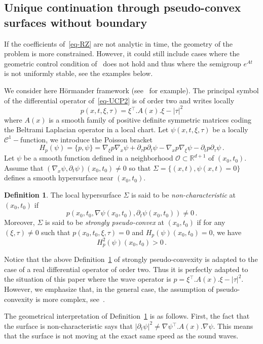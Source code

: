 \documentclass[11pt]{article}
\theoremstyle{definition}
\newtheorem{defi}[theo]{Definition}
\numberwithin{equation}{section}
\numberwithin{figure}{section}
\numberwithin{table}{section}
\newcommand{\RR}{\mathbb{R}}
\newcommand{\Cc}{\mathcal{C}}
\newcommand{\Oc}{\mathcal{O}}
\newcommand{\grad}{\nabla}
\newcommand{\trans}{{^{\intercal}}}
\begin{document}
\subsection{Unique continuation through pseudo-convex surfaces without boundary}\label{subsectUCPwithout}
If the coefficients of~\eqref{eq-RZ} are not analytic in time, the geometry of the problem is more constrained. However, it could still include cases where the geometric control condition of~\cite{BLR} does not hold and thus where the semigroup $e^{At}$ is not uniformly stable, see the examples below.

We consider here H\"ormander framework (see~\cite{Hormander} for example). The principal symbol of the differential operator of~\eqref{eq-UCP2} is of order two and writes locally
\[
p(x,t,\xi,\tau)=\xi\trans.A(x).\xi-|\tau|^2
\]
where $A(x)$ is a smooth family of positive definite symmetric matrices coding the Beltrami Laplacian operator in a local chart. Let $\psi(x,t,\xi,\tau)$ be a locally $\Cc^1-$function, we introduce the Poisson bracket
\[
H_p(\psi)=\{p,\psi\}= \grad_\xi p \grad_x \psi + \partial_\tau p \partial_t
\psi - \grad_x p \grad_\xi \psi - \partial_t p \partial_\tau \psi\,.
\]
Let $\psi$ be a smooth function defined in a neighborhood $\Oc\subset
\RR^{d+1}$ of $(x_0,t_0)$. Assume that $(\grad_x \psi,\partial_t
\psi)(x_0,t_0)\neq 0$ so that $\Sigma=\{(x,t),\psi(x,t)=0\}$ defines a smooth hypersurface near $(x_0,t_0)$.

\begin{defi}\label{defi-pseudoconvex}
The local hypersurface $\Sigma$ is said to be \emph{non-characteristic} at $(x_0,t_0)$ if
\[
p(x_0,t_0,\grad \psi(x_0,t_0),\partial_t \psi(x_0,t_0))\neq 0\,.
\]
Moreover, $\Sigma$ is said to be \emph{strongly pseudo-convex} at $(x_0,t_0)$ if for any $(\xi,\tau)\neq 0$ such that $p(x_0,t_0,\xi,\tau)=0$ and $H_p(\psi)(x_0,t_0)=0$, we have
\[
H_p^2(\psi)(x_0,t_0)>0\,.
\]
\end{defi}

Notice that the above Definition~\ref{defi-pseudoconvex} of strongly pseudo-convexity is adapted to the case of a real differential operator of order two. Thus it is perfectly adapted to the situation of this paper where the wave operator is $p=\xi\trans.A(x).\xi-|\tau|^2$. However, we emphasize that, in the general case, the assumption of pseudo-convexity is more complex, see~\cite{Hormander}.

The geometrical interpretation of Definition~\ref{defi-pseudoconvex} is as follows. First, the fact that the surface is non-characteristic says that $|\partial_t \psi|^2 \neq \grad\psi\trans.A(x).\grad \psi$. This means that the surface is not moving at the exact same speed as the sound waves.
\end{document}
